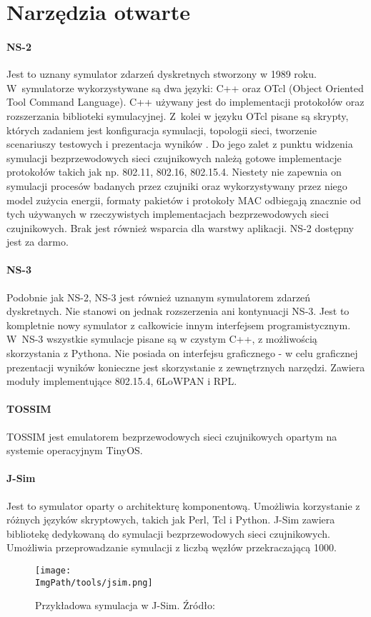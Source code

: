 \section{Narzędzia otwarte}
\paragraph{NS-2} Jest to uznany symulator zdarzeń dyskretnych stworzony w 1989 roku. W~symulatorze wykorzystywane są dwa języki: C++ oraz OTcl (Object Oriented Tool Command Language). C++ używany jest do implementacji protokołów oraz rozszerzania biblioteki symulacyjnej. Z~kolei w języku OTcl pisane są skrypty, których zadaniem jest konfiguracja symulacji, topologii sieci, tworzenie scenariuszy testowych i prezentacja wyników \cite{Heidemann2018, Meeneghan2004}. Do jego zalet z punktu widzenia symulacji bezprzewodowych sieci czujnikowych należą gotowe implementacje protokołów takich jak np. 802.11, 802.16, 802.15.4. Niestety nie zapewnia on symulacji  procesów badanych przez czujniki oraz wykorzystywany przez niego model zużycia energii, formaty pakietów i protokoły MAC odbiegają znacznie od tych używanych w rzeczywistych implementacjach bezprzewodowych sieci czujnikowych. Brak jest również wsparcia dla warstwy aplikacji. NS-2 dostępny jest za darmo.
\paragraph{NS-3 \cite{Nsnam}}
Podobnie jak NS-2, NS-3 jest również uznanym symulatorem zdarzeń dyskretnych. Nie stanowi on jednak rozszerzenia ani kontynuacji NS-3. Jest to kompletnie nowy symulator z całkowicie innym interfejsem programistycznym. W~NS-3 wszystkie symulacje pisane są w czystym C++, z możliwością skorzystania z Pythona. Nie posiada on interfejsu graficznego - w celu graficznej prezentacji wyników konieczne jest skorzystanie z zewnętrznych narzędzi. Zawiera moduły implementujące 802.15.4, 6LoWPAN i RPL.
\paragraph{TOSSIM \cite{Musznicki2012}}
TOSSIM jest emulatorem bezprzewodowych sieci czujnikowych opartym na systemie operacyjnym TinyOS. 
\paragraph{J-Sim \cite{Sobeih2006}}
Jest to symulator oparty o architekturę komponentową. Umożliwia korzystanie z różnych języków skryptowych, takich jak Perl, Tcl i Python. J-Sim zawiera bibliotekę dedykowaną do symulacji bezprzewodowych sieci czujnikowych. Umożliwia przeprowadzanie symulacji z liczbą węzłów przekraczającą 1000.
\begin{figure}[H]
	\begin{center}
		\centering
		\texttt{[image: \\ImgPath/tools/jsim.png]} 
	\end{center}
	\caption{Przykładowa symulacja w J-Sim. Źródło: \cite{KarkazisP.2012RmiJ}}
	\label{jsim}
\end{figure}
